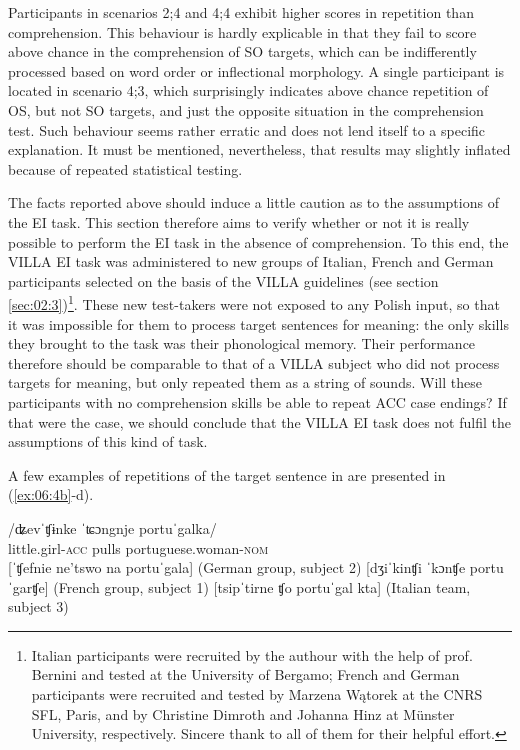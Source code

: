 Participants in scenarios 2;4 and 4;4 exhibit higher scores in repetition than comprehension. This behaviour is hardly explicable in that they fail to score above chance in the comprehension of SO targets, which can be indifferently processed based on word order or inflectional morphology. A single participant is located in scenario 4;3, which surprisingly indicates above chance repetition of OS, but not SO targets, and just the opposite situation in the comprehension test. Such behaviour seems rather erratic and does not lend itself to a specific explanation. It must be mentioned, nevertheless, that results may slightly inflated because of repeated statistical testing. 

The facts reported above should induce a little caution as to the assumptions of the EI task. This section therefore aims to verify whether or not it is really possible to perform the EI task in the absence of comprehension. To this end, the VILLA EI task was administered to new groups of Italian, French and German participants selected on the basis of the VILLA guidelines (see section \ref{sec:02:3})\footnote{Italian participants were recruited by the authour with the help of prof. Bernini and tested at the University of Bergamo; French and German participants were recruited and tested by Marzena Wątorek at the CNRS SFL, Paris, and by Christine Dimroth and Johanna Hinz at Münster University, respectively. Sincere thank to all of them for their helpful effort.}. These new test-takers were not exposed to any Polish input, so that it was impossible for them to process target sentences for meaning: the only skills they brought to the task was their phonological memory. Their performance therefore should be comparable to that of a VILLA subject who did not process targets for meaning, but only repeated them as a string of sounds. Will these participants with no comprehension skills be able to repeat ACC case endings? If that were the case, we should conclude that the VILLA EI task does not fulfil the assumptions of this kind of task.

A few examples of repetitions of the target sentence in  are presented in (\ref{ex:06:4b}-d).

\ea%
    \label{ex:06:4}
    \ea\label{ex:06:4a}
    \gll    /ʥevˈʧɨnke  ˈʨɔngnje  portuˈgalka/ \\
            little.girl-\textsc{acc}   pulls  portuguese.woman-\textsc{nom}\\
    \ex\label{ex:06:4b}
    [ˈʧefnie ne'tswo na portuˈgala] (German group, subject 2)
    \ex\label{ex:06:4c}
    [dʒiˈkinʧi ˈkɔnʧe portuˈgarʧe] (French group, subject 1)
    \ex\label{ex:06:4d}
    [tsipˈtirne ʧo portuˈgal kta] (Italian team, subject 3)
    \z
\z

